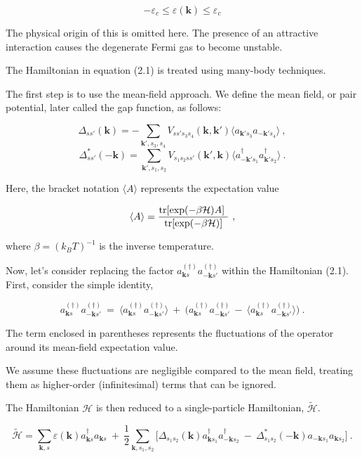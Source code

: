 \documentclass[uplatex,a4j,12pt,dvipdfmx]{jsarticle}
\begin{document}
\[
	-
	\varepsilon_{c}
	\leq
	\varepsilon(\bm{k})
	\leq
	\varepsilon_{c}
	\nonumber
\]

The physical origin of this is omitted here.
The presence of an attractive interaction causes the degenerate Fermi gas to become unstable.

The Hamiltonian in equation (2.1) is treated using many-body techniques.

The first step is to use the mean-field approach.
We define the mean field, or pair potential, later called the gap function, as follows:

\[
	\Delta_{s s'}(\bm{k})
	=
	- \sum_{ \bm{k}' , s_{3} , s_{4} }
	V_{s s' s_{3} s_{4} }(\bm{k},\bm{k}')
	\langle
	a_{ \bm{k}' s_{3} }
	a_{ - \bm{k}' s_{4} }
	\rangle
	\ ,
\]\[
	\Delta_{s s'}^{*}( - \bm{k} )
	=
	\sum_{ \bm{k}' , s_{1} , s_{2} }
	V_{ s_{1} s_{2} s s' }(\bm{k}',\bm{k})
	\langle
	a_{ - \bm{k}' s_{1} }^{\dagger}
	a_{ \bm{k}' s_{2} }^{\dagger}
	\rangle
	\ .
\]

Here, the bracket notation $\langle A \rangle$ represents the expectation value

\[
	\langle A \rangle
	=
	\dfrac{ {\rm tr} [ {\rm exp} ( - \beta \mathcal{H} ) A ]  }{ {\rm tr} [ {\rm exp} ( - \beta \mathcal{H} ) ] }
	\ ,
	\nonumber
\]

where $\beta = (k_{B} T)^{-1}$ is the inverse temperature.

Now, let's consider replacing the factor $a_{\bm{k}s}^{(\dagger)} a_{-\bm{k}s'}^{(\dagger)}$ within the Hamiltonian (2.1).
First, consider the simple identity,

\[
	a_{\bm{k}s}^{(\dagger)}
	a_{-\bm{k}s'}^{(\dagger)}
	\ = \
	\langle
	a_{\bm{k}s}^{(\dagger)}
	a_{-\bm{k}s'}^{(\dagger)}
	\rangle
	\ + \
	\Big(
	a_{\bm{k}s}^{(\dagger)}
	a_{-\bm{k}s'}^{(\dagger)}
	\ - \
	\langle
	a_{\bm{k}s}^{(\dagger)}
	a_{-\bm{k}s'}^{(\dagger)}
	\rangle
	\Big)
	\nonumber
	\ .
\]

The term enclosed in parentheses represents the fluctuations of the operator around its mean-field expectation value.

We assume these fluctuations are negligible compared to the mean field, treating them as higher-order (infinitesimal) terms that can be ignored.

The Hamiltonian $\mathcal{H}$ is then reduced to a single-particle Hamiltonian, $\tilde{\mathcal{H}}$.

\[
	\tilde{\mathcal{H}}
	=
	\sum_{\bm{k},s}
	\varepsilon(\bm{k})
	a_{\bm{k} s}^{\dagger}
	a_{\bm{k} s}
	\ + \
	\dfrac{1}{2}
	\sum_{\bm{k},s_{1},s_{2}}
	\Big[
		\Delta_{ s_{1} s_{2} }( \bm{k} )
		a_{\bm{k} s_{1}}^{\dagger}
		a_{-\bm{k} s_{2}}^{\dagger}
		\ - \
		\Delta_{ s_{1} s_{2} }^{*}( - \bm{k} )
		a_{-\bm{k} s_{1}}
		a_{\bm{k} s_{2}}
		\Big]
	\ .
\]
\end{document}
